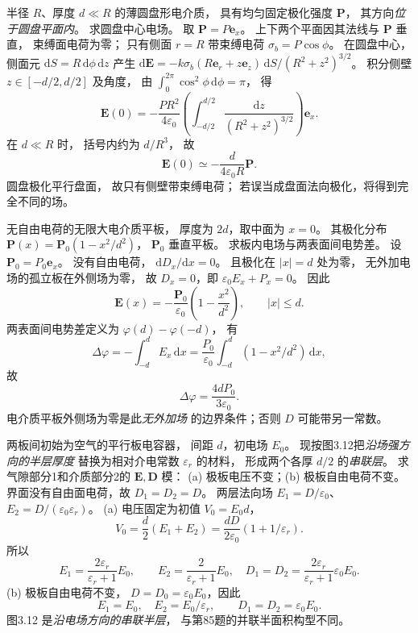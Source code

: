 半径 $R$、厚度 $d\ll R$ 的薄圆盘形电介质，
具有均匀固定极化强度 $\bm P$，
其方向\emph{位于圆盘平面内}。
求圆盘中心电场。
\exsolution
取 $\bm P=P\bm e_x$。
上下两个平面因其法线与 $\bm P$ 垂直，
束缚面电荷为零；
只有侧面 $r=R$ 带束缚电荷
$\sigma_b=P\cos\phi$。
在圆盘中心，侧面元
$\mathrm dS=R\,\mathrm d\phi\,\mathrm dz$
产生
$\mathrm d\bm E=
-k\sigma_b(R\bm e_r+z\bm e_z)
\,\mathrm dS/(R^2+z^2)^{3/2}$。
积分侧壁
$z\in[-d/2,d/2]$ 及角度，
由
$\int_0^{2\pi}\cos^2\phi\,\mathrm d\phi=\pi$，
得
\[
\bm E(0)=
-\frac{PR^2}{4\varepsilon_0}
\left(\int_{-d/2}^{d/2}
\frac{\mathrm dz}{(R^2+z^2)^{3/2}}\right)\bm e_x.
\]
在 $d\ll R$ 时，
括号内约为 $d/R^3$，
故
\[
\boxed{\bm E(0)\simeq
-\frac{d}{4\varepsilon_0R}\bm P}.
\]
\excheck 圆盘极化平行盘面，
故只有侧壁带束缚电荷；
若误当成盘面法向极化，将得到完全不同的场。

无自由电荷的无限大电介质平板，
厚度为 $2d$，取中面为 $x=0$。
其极化分布
$\bm P(x)=\bm P_0(1-x^2/d^2)$，
$\bm P_0$ 垂直平板。
求板内电场与两表面间电势差。
\exsolution
设 $\bm P_0=P_0\bm e_x$。
没有自由电荷，
$\mathrm dD_x/\mathrm dx=0$。
且极化在 $|x|=d$ 处为零，
无外加电场的孤立板在外侧场为零，
故 $D_x=0$，即
$\varepsilon_0E_x+P_x=0$。
因此
\[
\boxed{\bm E(x)=
-\frac{\bm P_0}{\varepsilon_0}
\left(1-\frac{x^2}{d^2}\right)},\qquad |x|\le d.
\]
两表面间电势差定义为
$\varphi(d)-\varphi(-d)$，
有
\[
\Delta\varphi=
-\int_{-d}^dE_x\,\mathrm dx
=\frac{P_0}{\varepsilon_0}
\int_{-d}^d(1-x^2/d^2)\,\mathrm dx,
\]
故
\[
\boxed{\Delta\varphi=\frac{4dP_0}{3\varepsilon_0}}.
\]
\excheck 电介质平板外侧场为零是此\emph{无外加场}
的边界条件；否则 $D$ 可能带另一常数。

两板间初始为空气的平行板电容器，
间距 $d$，初电场 $E_0$。
现按图3.12把\emph{沿场强方向的半层厚度}
替换为相对介电常数 $\varepsilon_r$ 的材料，
形成两个各厚 $d/2$ 的\emph{串联层}。
求气隙部分1和介质部分2的
$\bm E,\bm D$ 模：
(a) 极板电压不变；(b) 极板自由电荷不变。
\exsolution
界面没有自由面电荷，故
$D_1=D_2=D$。
两层法向场
$E_1=D/\varepsilon_0$、
$E_2=D/(\varepsilon_0\varepsilon_r)$。
(a) 电压固定为初值 $V_0=E_0d$，
\[
V_0=\frac d2(E_1+E_2)
=\frac{dD}{2\varepsilon_0}
(1+1/\varepsilon_r).
\]
所以
\[
\boxed{E_1=\frac{2\varepsilon_r}{\varepsilon_r+1}E_0},
\qquad
\boxed{E_2=\frac2{\varepsilon_r+1}E_0},
\quad
\boxed{D_1=D_2=
\frac{2\varepsilon_r}{\varepsilon_r+1}\varepsilon_0E_0}.
\]
(b) 极板自由电荷不变，
$D=D_0=\varepsilon_0E_0$，因此
\[
\boxed{E_1=E_0,\quad E_2=E_0/\varepsilon_r},
\qquad
\boxed{D_1=D_2=\varepsilon_0E_0}.
\]
\excheck 图3.12 是\emph{沿电场方向的串联半层}，
与第85题的并联半面积构型不同。

